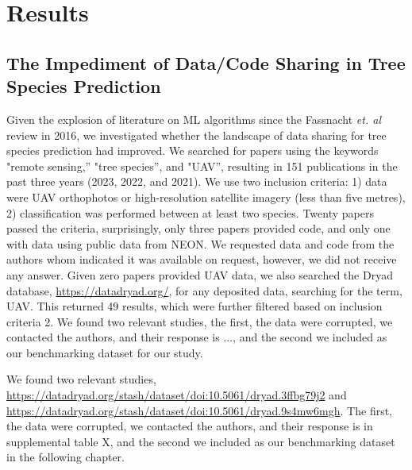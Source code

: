 \documentclass[9pt,lineno]{elife}
\begin{document}

\section{Results}
\subsection{The Impediment of Data/Code Sharing in Tree Species Prediction}
Given the explosion of literature on ML algorithms since the Fassnacht \textit{et. al} review in 2016, we investigated whether the landscape of data sharing for tree species prediction had improved. We searched for papers using the keywords "remote sensing,'' "tree species'', and "UAV'', resulting in 151 publications in the past three years (2023, 2022, and 2021). We use two inclusion criteria: 1) data were UAV orthophotos or high-resolution satellite imagery (less than five metres), 2) classification was performed between at least two species. Twenty papers passed the criteria, surprisingly, only three papers provided code, and only one with data using public data from NEON. We requested data and code from the authors whom indicated it was available on request, however, we did not receive any answer. Given zero papers provided UAV data, we also searched the Dryad database, \url{https://datadryad.org/}, for any deposited data, searching for the term, UAV. This returned 49 results, which were further filtered based on inclusion criteria 2. We found two relevant studies, the first, the data were corrupted, we contacted the authors, and their response is ..., and the second we included as our benchmarking dataset for our study.

We found two relevant studies, \url{https://datadryad.org/stash/dataset/doi:10.5061/dryad.3ffbg79j2} and \url{https://datadryad.org/stash/dataset/doi:10.5061/dryad.9s4mw6mgh}. The first, the data were corrupted, we contacted the authors, and their response is in supplemental table X, and the second we included as our benchmarking dataset in the following chapter.
\end{document}
